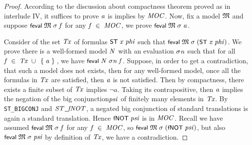 \documentclass[letterpaper]{article}
\renewcommand{\HOLConst}[1]{{\textsf{\upshape\small #1}}}
\renewcommand{\HOLinline}[1]{\ensuremath{#1}}
\begin{document}
\begin{proof}
According to the discussion about compactness theorem proved as in interlude IV, it suffices to prove \HOLinline{\HOLFreeVar{a}} is implies by \HOLinline{\HOLFreeVar{MOC}}. Now, fix a model \HOLinline{\HOLFreeVar{\ensuremath{\mathfrak{M}}}} and suppose \HOLinline{\HOLConst{feval}\;\HOLFreeVar{\ensuremath{\mathfrak{M}}}\;\HOLFreeVar{\ensuremath{\sigma}}\;\HOLFreeVar{f}} for any \HOLinline{\HOLFreeVar{f}\;\HOLSymConst{\HOLTokenIn{}}\;\HOLFreeVar{MOC}}, we prove \HOLinline{\HOLConst{feval}\;\HOLFreeVar{\ensuremath{\mathfrak{M}}}\;\HOLFreeVar{\ensuremath{\sigma}}\;\HOLFreeVar{a}}. 

Consider of the set \HOLinline{\HOLFreeVar{Tx}} of formulas \HOLinline{\HOLConst{ST}\;\HOLFreeVar{x}\;\HOLFreeVar{phi}} such that \HOLinline{\HOLConst{feval}\;\HOLFreeVar{\ensuremath{\mathfrak{M}}}\;\HOLFreeVar{\ensuremath{\sigma}}\;(\HOLConst{ST}\;\HOLFreeVar{x}\;\HOLFreeVar{phi})}. We prove there is a well-formed model \HOLinline{\HOLFreeVar{N}} with an evaluation \HOLinline{\HOLFreeVar{\ensuremath{\sigma}n}} such that for all \HOLinline{\HOLFreeVar{f}\;\HOLSymConst{\HOLTokenIn{}}\;\HOLFreeVar{Tx}\;\HOLSymConst{\HOLTokenUnion{}}\;\HOLTokenLeftbrace{}\HOLFreeVar{a}\HOLTokenRightbrace{}}, we have \HOLinline{\HOLConst{feval}\;\HOLFreeVar{N}\;\HOLFreeVar{\ensuremath{\sigma}n}\;\HOLFreeVar{f}}. 
Suppose, in order to get a contradiction, that such a model does not exists, then for any well-formed model, once all the formulas in \HOLinline{\HOLFreeVar{Tx}} are satisfied, then \HOLinline{\HOLFreeVar{a}} is not satisfied. Then by compactness, there exists a finite subset of \HOLinline{\HOLFreeVar{Tx}} implies $\lnot a$. Taking its contrapositive, then \HOLinline{\HOLFreeVar{a}} implies the negation of the big conjunction\HOLinline{\HOLFreeVar{psi}} of finitely many elements in \HOLinline{\HOLFreeVar{Tx}}. By \texttt{ST_BIGCONJ} and \HOLinline{\HOLFreeVar{ST\HOLTokenUnderscore{}fNOT}}, a negated big conjunction of standard translations is again a standard translation. Hence \HOLinline{\HOLConst{fNOT}\;\HOLFreeVar{psi}} is in \HOLinline{\HOLFreeVar{MOC}}. Recall we have assumed \HOLinline{\HOLConst{feval}\;\HOLFreeVar{\ensuremath{\mathfrak{M}}}\;\HOLFreeVar{\ensuremath{\sigma}}\;\HOLFreeVar{f}} for any \HOLinline{\HOLFreeVar{f}\;\HOLSymConst{\HOLTokenIn{}}\;\HOLFreeVar{MOC}}, so \HOLinline{\HOLConst{feval}\;\HOLFreeVar{\ensuremath{\mathfrak{M}}}\;\HOLFreeVar{\ensuremath{\sigma}}\;(\HOLConst{fNOT}\;\HOLFreeVar{psi})}, but also \HOLinline{\HOLConst{feval}\;\HOLFreeVar{\ensuremath{\mathfrak{M}}}\;\HOLFreeVar{\ensuremath{\sigma}}\;\HOLFreeVar{psi}} by definition of \HOLinline{\HOLFreeVar{Tx}}, we have a contradiction. 


\end{proof}
\end{document}
